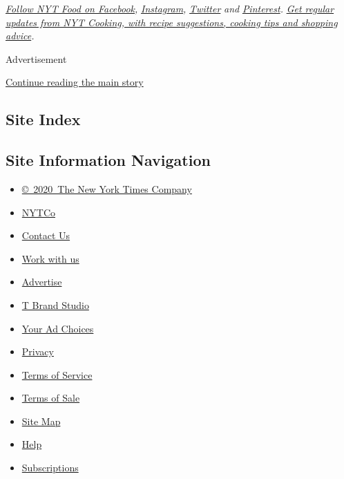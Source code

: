 \href{https://www.facebookcorewwwi.onion/nytfood/}{\emph{Follow NYT Food
on Facebook}}\emph{,}
\href{https://instagram.com/nytfood}{\emph{Instagram}}\emph{,}
\href{https://twitter.com/nytfood}{\emph{Twitter}} \emph{and}
\href{https://www.pinterest.com/nytfood/}{\emph{Pinterest}}\emph{.}
\href{https://www.nytimes3xbfgragh.onion/newsletters/cooking}{\emph{Get
regular updates from NYT Cooking, with recipe suggestions, cooking tips
and shopping advice}}\emph{.}

Advertisement

\protect\hyperlink{after-bottom}{Continue reading the main story}

\hypertarget{site-index}{%
\subsection{Site Index}\label{site-index}}

\hypertarget{site-information-navigation}{%
\subsection{Site Information
Navigation}\label{site-information-navigation}}

\begin{itemize}
\tightlist
\item
  \href{https://help.nytimes3xbfgragh.onion/hc/en-us/articles/115014792127-Copyright-notice}{©~2020~The
  New York Times Company}
\end{itemize}

\begin{itemize}
\tightlist
\item
  \href{https://www.nytco.com/}{NYTCo}
\item
  \href{https://help.nytimes3xbfgragh.onion/hc/en-us/articles/115015385887-Contact-Us}{Contact
  Us}
\item
  \href{https://www.nytco.com/careers/}{Work with us}
\item
  \href{https://nytmediakit.com/}{Advertise}
\item
  \href{http://www.tbrandstudio.com/}{T Brand Studio}
\item
  \href{https://www.nytimes3xbfgragh.onion/privacy/cookie-policy\#how-do-i-manage-trackers}{Your
  Ad Choices}
\item
  \href{https://www.nytimes3xbfgragh.onion/privacy}{Privacy}
\item
  \href{https://help.nytimes3xbfgragh.onion/hc/en-us/articles/115014893428-Terms-of-service}{Terms
  of Service}
\item
  \href{https://help.nytimes3xbfgragh.onion/hc/en-us/articles/115014893968-Terms-of-sale}{Terms
  of Sale}
\item
  \href{https://spiderbites.nytimes3xbfgragh.onion}{Site Map}
\item
  \href{https://help.nytimes3xbfgragh.onion/hc/en-us}{Help}
\item
  \href{https://www.nytimes3xbfgragh.onion/subscription?campaignId=37WXW}{Subscriptions}
\end{itemize}
